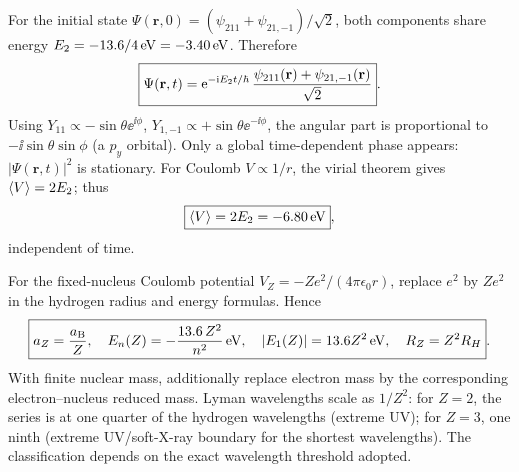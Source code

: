 For the initial state
$\Psi(\mathbf r,0)=
(\psi_{211}+\psi_{21,-1})/\sqrt2$,
both components share energy
$E_2=-13.6/4\,{\rm eV}=-3.40\,{\rm eV}$.
Therefore
\begin{equation}
\boxed{\Psi(\mathbf r,t)=
\mathrm e^{-\mathrm i E_2t/\hbar}\,
\frac{\psi_{211}(\mathbf r)+\psi_{21,-1}(\mathbf r)}
{\sqrt2}}.
\end{equation}
Using $Y_{11}\propto-\sin\theta\ee^{\ii\phi}$,
$Y_{1,-1}\propto+\sin\theta\ee^{-\ii\phi}$,
the angular part is proportional to
$-\ii\sin\theta\sin\phi$ (a $p_y$ orbital).
Only a global time-dependent phase appears:
$|\Psi(\mathbf r,t)|^2$ is stationary.
For Coulomb $V\propto1/r$, the virial theorem
gives $\langle V\rangle=2E_2$; thus
\begin{equation}
\boxed{\langle V\rangle=2E_2=-6.80\,{\rm eV}},
\end{equation}
independent of time.

For the fixed-nucleus Coulomb potential
$V_Z=-Ze^2/(4\pi\epsilon_0r)$,
replace $e^2$ by $Ze^2$ in the hydrogen
radius and energy formulas. Hence
\begin{equation}
\boxed{a_Z=\frac{a_{\mathrm B}}{Z},\quad
E_n(Z)=-\frac{13.6\,Z^2}{n^2}\,{\rm eV},\quad
|E_1(Z)|=13.6Z^2\,{\rm eV},\quad
R_Z=Z^2R_H}.
\end{equation}
With finite nuclear mass, additionally
replace electron mass by the corresponding
electron--nucleus reduced mass.
Lyman wavelengths scale as $1/Z^2$:
for $Z=2$, the series is at one quarter
of the hydrogen wavelengths (extreme UV);
for $Z=3$, one ninth (extreme UV/soft-X-ray
boundary for the shortest wavelengths).
The classification depends on the exact
wavelength threshold adopted.

